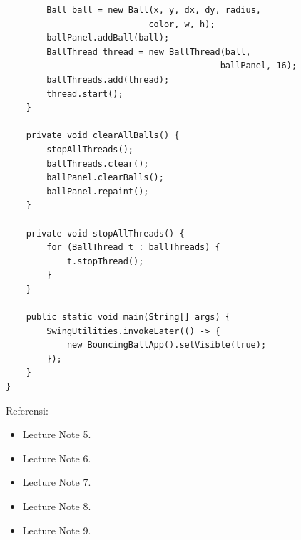 \documentclass[a4paper]{article}
\begin{document}
\begin{enumerate}[itemsep=1em]
\begin{enumerate}[itemsep=1em]
\begin{verbatim}
        Ball ball = new Ball(x, y, dx, dy, radius, 
                            color, w, h);
        ballPanel.addBall(ball);
        BallThread thread = new BallThread(ball, 
                                          ballPanel, 16);
        ballThreads.add(thread);
        thread.start();
    }

    private void clearAllBalls() {
        stopAllThreads();
        ballThreads.clear();
        ballPanel.clearBalls();
        ballPanel.repaint();
    }

    private void stopAllThreads() {
        for (BallThread t : ballThreads) {
            t.stopThread();
        }
    }

    public static void main(String[] args) {
        SwingUtilities.invokeLater(() -> {
            new BouncingBallApp().setVisible(true);
        });
    }
}
    \end{verbatim}
  \end{enumerate}
\end{enumerate}

Referensi:

\begin{itemize}
  \item Lecture Note 5.
  \item Lecture Note 6.
  \item Lecture Note 7.
  \item Lecture Note 8.
  \item Lecture Note 9.
\end{itemize}
\end{document}
